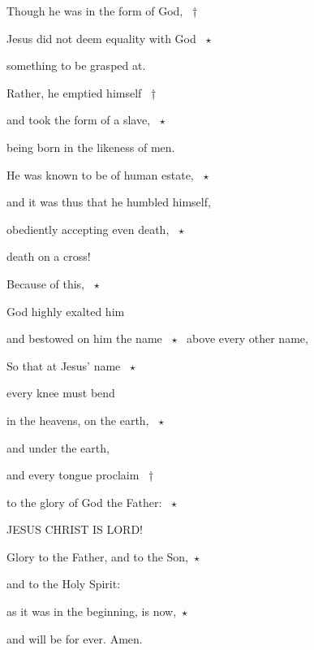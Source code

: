 \noindent Though he was in the form of God, ~†~\nopagebreak

Jesus did not deem equality with God ~$\star$~\nopagebreak

something to be grasped at.

\noindent Rather, he emptied himself ~†~\nopagebreak

and took the form of a slave, ~$\star$~\nopagebreak

being born in the likeness of men.

\noindent He was known to be of human estate, ~$\star$~\nopagebreak

and it was thus that he humbled himself,

\noindent obediently accepting even death, ~$\star$~\nopagebreak

death on a cross!

\noindent Because of this, ~$\star$~\nopagebreak

God highly exalted him


\noindent and bestowed on him the name ~$\star$~\nopagebreak
above every other name,

\noindent So that at Jesus’ name ~$\star$~\nopagebreak

every knee must bend

\noindent in the heavens, on the earth, ~$\star$~\nopagebreak

and under the earth,

\noindent and every tongue proclaim ~†~\nopagebreak

to the glory of God the Father: ~$\star$~\nopagebreak

JESUS CHRIST IS LORD!

\noindent Glory to the Father, and to the Son,~$\star$~\nopagebreak

and to the Holy Spirit:

\noindent as it was in the beginning, is now,~$\star$~\nopagebreak

and will be for ever. Amen.
